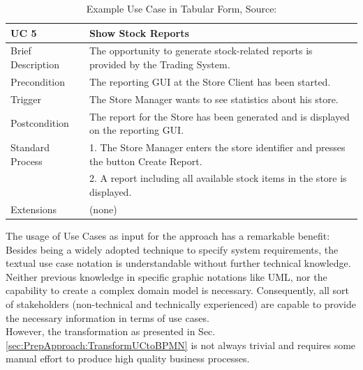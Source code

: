 \begin{table}[!h]
	\centering
	\begin{tabularx}{\textwidth}{|l||X|}
		\hline
		UC 5 & Show Stock Reports \\ 
		\hline
		Brief Description &  The opportunity to generate stock-related reports is provided
		by the Trading System. \\
		\hline
		Precondition & The reporting GUI at the Store Client has been started. \\
		\hline
		Trigger & The Store Manager wants to see statistics about his store. \\
		\hline
		Postcondition & The report for the Store has been generated and is displayed on
		the reporting GUI. \\
		\hline 
		Standard Process &
		
		1. The Store Manager enters the store identifier and presses the button Create
		Report.  \\
		& 2. A report including all available stock items in the store is displayed. \\  
		\hline
		Extensions & (none) \\ \hline
		
		
	\end{tabularx}
	\caption{Example Use Case in Tabular Form, Source: \cite{CoCoMEOld}}
	\label{tab:exampleUseCase}
	
\end{table}

\noindent
The usage of Use Cases as input for the approach has a remarkable benefit: Besides being a widely adopted technique to specify system requirements, the textual use case notation is understandable without further technical knowledge. Neither previous knowledge in specific graphic notations like UML, nor the capability to create a complex domain model is necessary. Consequently, all sort of stakeholders (non-technical and technically experienced) are capable to provide the necessary information in terms of use cases. \\
However, the transformation as presented in Sec.\ref{sec:PrepApproach:TransformUCtoBPMN} is not always trivial and requires some manual effort to produce high quality business processes. 





